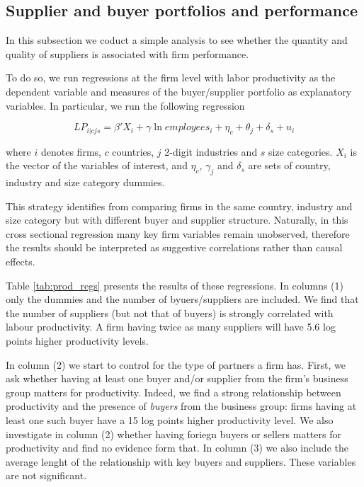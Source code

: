 \documentclass[final, dvipsnames, authoryear,12pt]{elsarticle}
\begin{document}
\subsection{Supplier and buyer portfolios and performance}

In this subsection we coduct a simple analysis to see whether the quantity and quality of suppliers is associated with firm performance. 

To do so, we run regressions at the firm level with labor productivity as the dependent variable and measures of the buyer/supplier portfolio as explanatory variables. In particular, we run the following regression

\begin{equation}
    LP_{i|cjs}=\beta' X_{i}+\gamma \ln employees_i+\eta_c+\theta_j+\delta_s+u_i
\end{equation}{}

where $i$ denotes firms, $c$ countries, $j$ 2-digit industries and $s$ size categories. $X_{i}$ is the vector of the variables of interest, and $\eta_c$, $\gamma_j$ and $\delta_s$ are sets of country, industry and size category dummies. 

This strategy identifies from comparing firms in the same country, industry and size category but with different buyer and supplier structure. Naturally, in this cross sectional regression many key firm variables remain unobserved, therefore the results should be interpreted as suggestive correlations rather than causal effects.

Table \ref{tab:prod_regs} presents the results of these regressions. In columns (1) only the dummies and the number of byuers/suppliers are included. We find that the number of suppliers (but not that of buyers) is strongly correlated with labour productivity. A firm having twice as many suppliers will have 5.6 log points higher productivity levels. 

In column (2) we start to control for the type of partners a firm has. First, we ask whether having at least one buyer and/or supplier from the firm's business group matters for productivity. Indeed, we find a strong relationship between productivity and the presence of \textit{buyers} from the business group: firms having at least one such buyer have a 15 log points higher productivity level. We also investigate in column (2) whether having foriegn buyers or sellers matters for productivity and find no evidence form that. In column (3) we also include the average lenght of the relationship with key buyers and suppliers. These variables are not significant.
\end{document}
